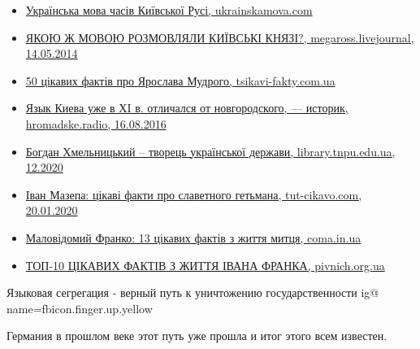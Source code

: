 \begin{itemize}
\begin{itemize}
\begin{itemize}
\item \href{https://ukrainskamova.com/publ/zagalni_dani/istorija_ukrajinskoji_movi/ukrajinska_mova_chasiv_kijivskoji_rusi/3-1-0-6}{%
Українська мова часів Київської Русі, ukrainskamova.com%
}

\item \href{https://megaross.livejournal.com/15232.html}{%
ЯКОЮ Ж МОВОЮ РОЗМОВЛЯЛИ КИЇВСЬКІ КНЯЗІ?, megaross.livejournal, 14.05.2014%
}

\item \href{https://tsikavi-fakty.com.ua/50-tsikavyh-faktiv-pro-yaroslava-mudrogo}{%
50 цікавих фактів про Ярослава Мудрого, tsikavi-fakty.com.ua%
}

\item \href{https://hromadske.radio/podcasts/kyiv-donbas/yazyk-kyeva-uzhe-v-hi-v-otlychalsya-ot-novgorodskogo-ystoryk}{%
Язык Киева уже в ХI в. отличался от новгородского, — историк, hromadske.radio, 16.08.2016%
}

\item \href{http://www.library.tnpu.edu.ua/index.php/en/virtual-exhibitions/3670-xmelnyckyj-bogdan}{%
Богдан Хмельницький – творець української держави, library.tnpu.edu.ua, 12.2020%
}

\item \href{https://tut-cikavo.com/pro-ukrainu/vydatni-liudy/950-ivan-mazepa}{%
Іван Мазепа: цікаві факти про славетного гетьмана, tut-cikavo.com, 20.01.2020%
}

\item \href{https://coma.in.ua/26828}{%
Маловідомий Франко: 13 цікавих фактів з життя митця, coma.in.ua%
}

\item \href{http://pivnich.org.ua/997-top-10-ckavih-faktv-z-zhittya-vana-franka.html}{%
ТОП-10 ЦІКАВИХ ФАКТІВ З ЖИТТЯ ІВАНА ФРАНКА, pivnich.org.ua%
}

\end{itemize}

\end{itemize}

 
Языковая сегрегация - верный путь к уничтожению государственности  
\ifcmt
  ig@ name=fbicon.finger.up.yellow
\fi

Германия в прошлом веке этот путь уже прошла и итог этого всем известен.


\end{itemize}

